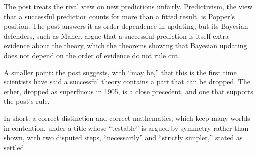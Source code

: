\begin{afterword}
The post treats the rival view on new predictions unfairly. Predictivism, the view that a successful prediction counts for more than a fitted result, is Popper's position. The post answers it as order-dependence in updating, but its Bayesian defenders, such as Maher, argue that a successful prediction is itself extra evidence about the theory, which the theorems showing that Bayesian updating does not depend on the order of evidence do not rule out.

A smaller point: the post suggests, with ``may be,'' that this is the first time scientists have said a successful theory contains a part that can be dropped. The ether, dropped as superfluous in 1905, is a close precedent, and one that supports the post's rule.

In short: a correct distinction and correct mathematics, which keep many-worlds in contention, under a title whose ``testable'' is argued by symmetry rather than shown, with two disputed steps, ``necessarily'' and ``strictly simpler,'' stated as settled.
\end{afterword}

